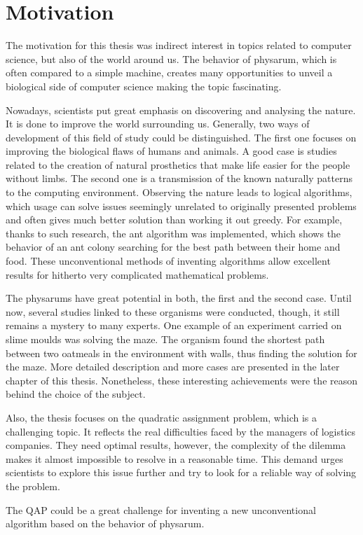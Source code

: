 \section{Motivation}
\label{section:introduction_motivation}

The motivation for this thesis was indirect interest in topics related to computer science, but also of the world around us. The behavior of physarum, which is often compared to a simple machine, creates many opportunities to unveil a biological side of computer science making the topic fascinating.

Nowadays, scientists put great emphasis on discovering and analysing the nature. It is done to improve the world surrounding us. Generally, two ways of development of this field of study could be distinguished. The first one focuses on improving the biological flaws of humans and animals. A good case is studies related to the creation of natural prosthetics that make life easier for the people without limbs. The second one is a transmission of the known naturally patterns to the computing environment. Observing the nature leads to logical algorithms, which usage can solve issues seemingly unrelated to originally presented problems and often gives much better solution than working it out greedy. For example, thanks to such research, the ant algorithm was implemented, which shows the behavior of an ant colony searching for the best path between their home and food. These unconventional methods of inventing algorithms allow excellent results for hitherto very complicated mathematical problems.

The physarums have great potential in both, the first and the second case. Until now, several studies linked to these organisms were conducted, though, it still remains a mystery to many experts. One example of an experiment carried on slime moulds was solving the maze. The organism found the shortest path between two oatmeals in the environment with walls, thus finding the solution for the maze. More detailed description and more cases are presented in the later chapter of this thesis. Nonetheless, these interesting achievements were the reason behind the choice of the subject.

Also, the thesis focuses on the quadratic assignment problem, which is a challenging topic. It reflects the real difficulties faced by the managers of logistics companies. They need optimal results, however, the complexity of the dilemma makes it almost impossible to resolve in a reasonable time. This demand urges scientists to explore this issue further and try to look for a reliable way of solving the problem. 

The QAP could be a great challenge for inventing a new unconventional algorithm based on the behavior of physarum. 